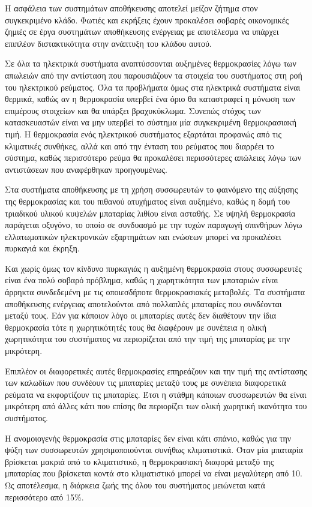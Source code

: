 \documentclass[12pt]{report}
\begin{document}
Η ασφάλεια των συστημάτων αποθήκευσης αποτελεί μείζον ζήτημα στον συγκεκριμένο κλάδο. Φωτιές και εκρήξεις
έχουν προκαλέσει σοβαρές οικονομικές ζημιές σε έργα συστημάτων αποθήκευσης ενέργειας με αποτέλεσμα να υπάρχει επιπλέον
διστακτικότητα στην ανάπτυξη του κλάδου αυτού.

Σε όλα τα ηλεκτρικά συστήματα αναπτύσσονται αυξημένες θερμοκρασίες λόγω των απωλειών από την αντίσταση που παρουσιάζουν τα στοιχεία του
συστήματος στη ροή του ηλεκτρικού ρεύματος. Όλα τα προβλήματα όμως στα
ηλεκτρικά συστήματα είναι θερμικά, καθώς αν η θερμοκρασία υπερβεί ένα όριο θα καταστραφεί η μόνωση των επιμέρους στοιχείων και θα υπάρξει βραχυκύκλωμα.
Συνεπώς στόχος των κατασκευαστών είναι να μην υπερβεί το σύστημα μία συγκεκριμένη θερμοκρασιακή τιμή.
Η θερμοκρασία ενός ηλεκτρικού συστήματος εξαρτάται προφανώς από τις κλιματικές συνθήκες, αλλά και από την ένταση του ρεύματος που διαρρέει το σύστημα,
καθώς περισσότερο ρεύμα θα προκαλέσει περισσότερες απώλειες λόγω των αντιστάσεων που αναφέρθηκαν προηγουμένως.

Στα συστήματα αποθήκευσης με τη χρήση συσσωρευτών το φαινόμενο της αύξησης της θερμοκρασίας και του πιθανού ατυχήματος είναι αυξημένο,
καθώς η δομή του τριαδικού υλικού κυψελών μπαταρίας λιθίου είναι
ασταθής. Σε υψηλή θερμοκρασία παράγεται οξυγόνο, το οποίο σε συνδυασμό με την τυχών παραγωγή σπινθήρων λόγω
ελλατωματικών ηλεκτρονικών εξαρτημάτων και ενώσεων μπορεί να προκαλέσει πυρκαγιά και έκρηξη.

Και χωρίς όμως τον κίνδυνο πυρκαγιάς η αυξημένη θερμοκρασία στους συσσωρευτές είναι ένα πολύ σοβαρό πρόβλημα, καθώς η χωρητικότητα των μπαταριών είναι
άρρηκτα συνδεδεμένη με τις οποιεσδήποτε θερμοκρασιακές μεταβολές. Τα συστήματα αποθήκευσης ενέργειας αποτελούνται από πολλαπλές μπαταρίες που συνδέονται μεταξύ τους.
Εάν για κάποιον λόγο οι μπαταρίες αυτές δεν διαθέτουν την ίδια θερμοκρασία τότε η χωρητικότητές τους θα διαφέρουν με συνέπεια η ολική χωρητικότητα του συστήματος να
περιορίζεται από την τιμή της μπαταρίας με την μικρότερη.

Επιπλέον οι διαφορετικές αυτές θερμοκρασίες επηρεάζουν και την τιμή της αντίστασης των καλωδίων που συνδέουν τις μπαταρίες μεταξύ τους με συνέπεια διαφορετικά ρεύματα
να εκφορτίζουν τις μπαταρίες. Έτσι η στάθμη κάποιων συσσωρευτών θα είναι μικρότερη από άλλες κάτι που επίσης θα περιορίζει των ολική χωρητική ικανότητα του συστήματος.

Η ανομοιογενής θερμοκρασία στις μπαταρίες δεν είναι κάτι σπάνιο, καθώς για την ψύξη των συσσωρευτών χρησιμοποιούνται συνήθως κλιματιστικά.
Όταν μία μπαταρία βρίσκεται μακριά από το κλιματιστικό, η θερμοκρασιακή διαφορά μεταξύ της μπαταρίας που βρίσκεται κοντά στο κλιματιστικό μπορεί να είναι μεγαλύτερη από 10{}.
Ως αποτέλεσμα, η διάρκεια ζωής της όλου του συστήματος μειώνεται κατά περισσότερο από 15\%.
\end{document}
